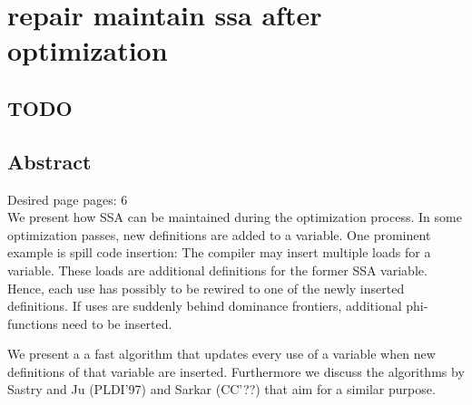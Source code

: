 \applynumberofpages\chapter{repair maintain ssa after optimization }
\section{TODO}

\section{Abstract}

Desired page pages: 6 \\

We present how SSA can be maintained during the optimization process. 
In some optimization passes, new definitions are added to a variable.
One prominent example is spill code insertion:
The compiler may insert multiple loads for a variable.
These loads are additional definitions for the former SSA variable.
Hence, each use has possibly to be rewired to one of the newly inserted definitions.
If uses are suddenly behind dominance frontiers, additional phi-functions need to be inserted.

We present a a fast algorithm that updates every use of a variable when new definitions of that variable are inserted.
Furthermore we discuss the algorithms by Sastry and Ju (PLDI'97) and Sarkar (CC'??) that aim for a similar purpose.

